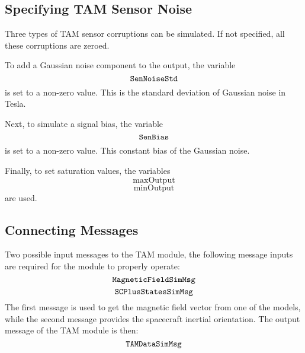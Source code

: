 \subsection{Specifying TAM Sensor Noise}
Three types of TAM sensor corruptions can be simulated.  If not specified, all these corruptions are zeroed.  

To add a Gaussian noise component to the output, the variable
$$
	{\tt SenNoiseStd}
$$
is set to a non-zero value.  This is the standard deviation of Gaussian noise in Tesla. 

Next, to simulate a signal bias, the variable
$$
	{\tt SenBias}
$$
is set to a non-zero value.   This constant bias of the Gaussian noise.  

Finally, to set saturation values, the variables
$$
	\mathrm{maxOutput}
	$$
	$$
	\mathrm{minOutput}
$$
are used. 

\subsection{Connecting Messages}
Two possible input messages to the TAM module, the following message inputs are required for the module to properly operate:
$$
	{\tt MagneticFieldSimMsg}
	$$
	$$
	{\tt SCPlusStatesSimMsg}
$$
The first message is used to get the magnetic field vector from one of the models, while the second message provides the spacecraft inertial orientation. The output message of the TAM module is then:
$$
	{\tt TAMDataSimMsg}
$$